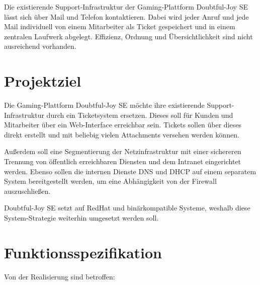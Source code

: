 \documentclass[a4paper,12pt,headings=small,ngerman,bibliography=totoc]{scrartcl}
\begin{document}
Die existierende Support-Infrastruktur der Gaming-Plattform Doubtful-Joy SE lässt sich über Mail und Telefon kontaktieren. Dabei wird jeder Anruf und jede Mail individuell von einem Mitarbeiter als Ticket gespeichert und in einem zentralen Laufwerk abgelegt. Effizienz, Ordnung und Übersichtlichkeit sind nicht ausreichend vorhanden.


\section{Projektziel}

Die Gaming-Plattform Doubtful-Joy SE möchte ihre existierende Support-Infrastruktur durch ein Ticketsystem ersetzen. Dieses soll für Kunden und Mitarbeiter über ein Web-Interface erreichbar sein. Tickets sollen über dieses direkt erstellt und mit beliebig vielen Attachments versehen werden können.

Außerdem soll eine Segmentierung der Netzinfrastruktur mit einer sichereren Trennung von öffentlich erreichbaren Diensten und dem Intranet eingerichtet werden. Ebenso sollen die internen Dienste DNS und DHCP auf einem separatem System bereitgestellt werden, um eine Abhängigkeit von der Firewall auszuschließen.

Doubtful-Joy SE setzt auf RedHat und binärkompatible Systeme, weshalb diese System-Strategie weiterhin umgesetzt werden soll.


\section{Funktionsspezifikation}

Von der Realisierung sind betroffen:
\end{document}
